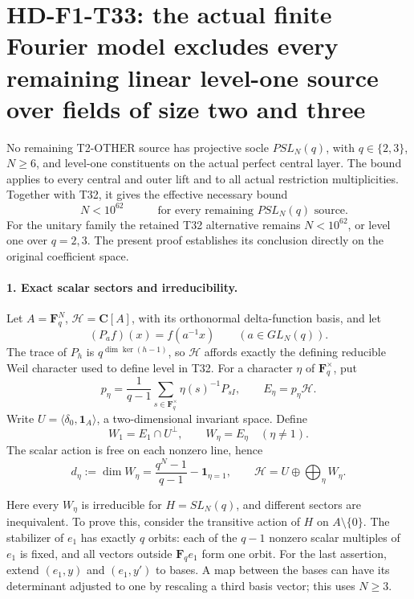 \section[HD-F1-T33: finite Fourier exclusion of linear level one]{HD-F1-T33: the actual finite Fourier model excludes every remaining linear level-one source over fields of size two and three}
\label{sec:f1-linear-level-one-fourier-exclusion}

No remaining T2-OTHER source has projective socle
\(PSL_N(q)\), with \(q\in\{2,3\}\), \(N\ge6\),
and level-one constituents on the actual perfect central
layer. The bound applies to every central and outer lift
and to all actual restriction multiplicities. Together
with T32, it gives the effective necessary bound
\[
 \boxed{\quad N<10^{62}\quad}
 \qquad\text{for every remaining }PSL_N(q)\text{ source.}
 \tag{F1T33.1}
\]
For the unitary family the retained T32 alternative
remains \(N<10^{62}\), or level one over \(q=2,3\).
The present proof establishes its conclusion directly
on the original coefficient space.

\paragraph{1. Exact scalar sectors and irreducibility.}
Let \(A=\mathbf F_q^N\), \(\mathcal H=\mathbf C[A]\),
with its orthonormal delta-function basis, and let
\[
 (P_a f)(x)=f(a^{-1}x)\qquad(a\in GL_N(q)).
 \tag{F1T33.2}
\]
The trace of \(P_h\) is \(q^{\dim\ker(h-1)}\), so
\(\mathcal H\) affords exactly the defining reducible
Weil character used to define level in T32.
For a character \(\eta\) of \(\mathbf F_q^\times\),
put
\[
 p_\eta=\frac1{q-1}\sum_{s\in\mathbf F_q^\times}
                  \eta(s)^{-1}P_{sI},
 \qquad E_\eta=p_\eta\mathcal H.
 \tag{F1T33.3}
\]
Write \(U=\langle\delta_0,\mathbf1_A\rangle\), a
two-dimensional invariant space. Define
\[
 W_1=E_1\cap U^\perp,\qquad
 W_\eta=E_\eta\quad(\eta\ne1).
 \tag{F1T33.4}
\]
The scalar action is free on each nonzero line, hence
\[
 d_\eta:=\dim W_\eta
 =\frac{q^N-1}{q-1}-\mathbf1_{\eta=1},
 \qquad
 \mathcal H=U\oplus\bigoplus_\eta W_\eta.
 \tag{F1T33.5}
\]

Here every \(W_\eta\) is irreducible for
\(H=SL_N(q)\), and different sectors are inequivalent.
To prove this, consider the transitive action of \(H\)
on \(A\setminus\{0\}\). The stabilizer of \(e_1\)
has exactly \(q\) orbits: each of the \(q-1\)
nonzero scalar multiples of \(e_1\) is fixed, and all
vectors outside \(\mathbf F_qe_1\) form one orbit.
For the last assertion, extend \((e_1,y)\) and
\((e_1,y')\) to bases. A map between the bases can
have its determinant adjusted to one by rescaling a
third basis vector; this uses \(N\ge3\).

